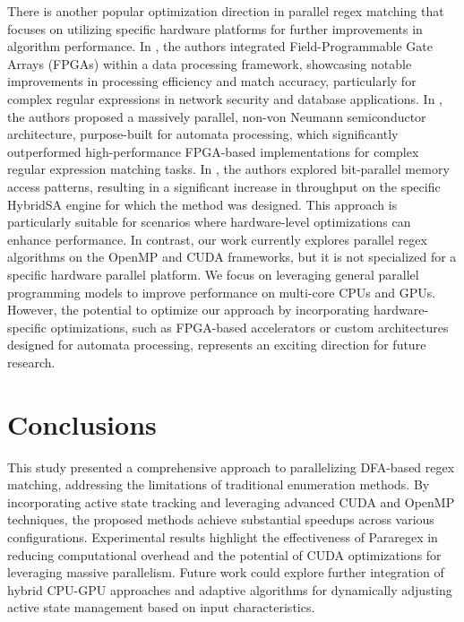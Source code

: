 \documentclass[sigconf]{acmart}
\begin{document}
There is another popular optimization direction in parallel regex matching that focuses on utilizing specific hardware platforms for further improvements in algorithm performance. In \cite{FPGA}, the authors integrated Field-Programmable Gate Arrays (FPGAs) within a data processing framework, showcasing notable improvements in processing efficiency and match accuracy, particularly for complex regular expressions in network security and database applications. In \cite{semi}, the authors proposed a massively parallel, non-von Neumann semiconductor architecture, purpose-built for automata processing, which significantly outperformed high-performance FPGA-based implementations for complex regular expression matching tasks. In \cite{HybridSA}, the authors explored bit-parallel memory access patterns, resulting in a significant increase in throughput on the specific HybridSA engine for which the method was designed. This approach is particularly suitable for scenarios where hardware-level optimizations can enhance performance.
In contrast, our work currently explores parallel regex algorithms on the OpenMP and CUDA frameworks, but it is not specialized for a specific hardware parallel platform. We focus on leveraging general parallel programming models to improve performance on multi-core CPUs and GPUs. However, the potential to optimize our approach by incorporating hardware-specific optimizations, such as FPGA-based accelerators or custom architectures designed for automata processing, represents an exciting direction for future research.

\section{Conclusions}

This study presented a comprehensive approach to parallelizing DFA-based regex matching, addressing the limitations of traditional enumeration methods. By incorporating active state tracking and leveraging advanced CUDA and OpenMP techniques, the proposed methods achieve substantial speedups across various configurations. Experimental results highlight the effectiveness of Pararegex in reducing computational overhead and the potential of CUDA optimizations for leveraging massive parallelism. Future work could explore further integration of hybrid CPU-GPU approaches and adaptive algorithms for dynamically adjusting active state management based on input characteristics.



\end{document}
